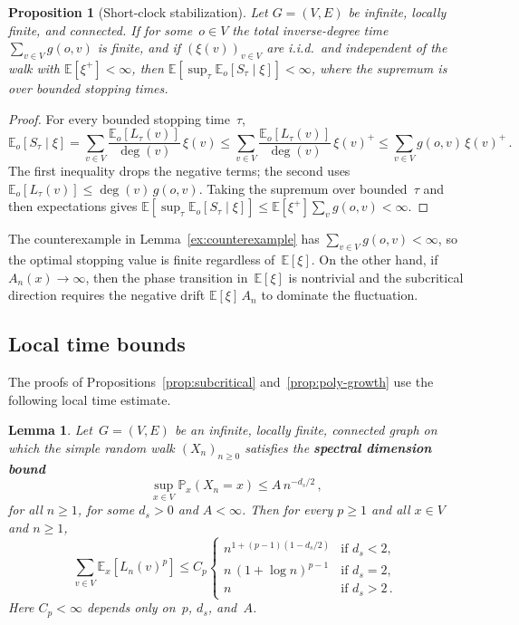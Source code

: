 \documentclass[aop]{imsart}
\theoremstyle{plain}
\newtheorem{proposition}[theorem]{Proposition}
\newtheorem{lemma}[theorem]{Lemma}
\theoremstyle{definition}
\newcommand{\E}{\mathbb{E}}
\renewcommand{\P}{\mathbb{P}}
\begin{document}
	\begin{proposition}[Short-clock stabilization]\label{prop:short-clock}
		Let $G=(V,E)$ be infinite, locally finite, and connected. If for some~$o \in V$ the total inverse-degree time $\sum_{v\in V}g(o,v)$ is finite, and if $(\xi(v))_{v\in V}$ are i.i.d.\ and independent of the walk with $\E[\xi^+]<\infty$, then $\E[\sup_\tau\E_o[S_\tau\mid\xi]] < \infty$, where the supremum is over bounded stopping times.
	\end{proposition}
	\begin{proof}
		For every bounded stopping time~$\tau$,
		\[
		\E_o[S_\tau\mid\xi]
		=\sum_{v\in V}\frac{\E_o[L_\tau(v)]}{\deg(v)}\,\xi(v)
		\leq\sum_{v\in V}\frac{\E_o[L_\tau(v)]}{\deg(v)}\,\xi(v)^+
		\leq\sum_{v\in V}g(o,v)\,\xi(v)^+\,.
		\]
		The first inequality drops the negative terms; the second uses $\E_o[L_\tau(v)]\leq\deg(v)\,g(o,v)$.
		Taking the supremum over bounded~$\tau$ and then expectations gives
		$\E[\sup_\tau\E_o[S_\tau\mid\xi]]\leq\E[\xi^+]\sum_v g(o,v)<\infty$.
	\end{proof}
	
	The counterexample in Lemma~\ref{ex:counterexample} has $\sum_{v\in V} g(o,v)<\infty$, so the optimal stopping value is finite regardless of~$\E[\xi]$. On the other hand, if $A_n(x)\to\infty$, then the phase transition in~$\E[\xi]$ is nontrivial and the subcritical direction requires the negative drift $\E[\xi]\,A_n$ to dominate the fluctuation.
	
	\subsection{Local time bounds}
	
	The proofs of Propositions~\ref{prop:subcritical} and~\ref{prop:poly-growth} use the following local time estimate.
	
	\begin{lemma}\label{lem:local-time}
		Let~$G = (V,E)$ be an infinite, locally finite, connected graph on which the simple random walk $(X_n)_{n\geq 0}$ satisfies the \textbf{spectral dimension bound}
		\begin{equation}\label{eq:return-bound}
			\sup_{x\in V}\P_x(X_n=x)\leq A\,n^{-d_s/2}\,,
		\end{equation}
		for all $n\geq 1$, for some $d_s>0$ and $A<\infty$.
		Then for every $p \geq 1$ and all $x \in V$ and $n \geq 1$,
		\[
		\sum_{v\in V} \E_x[L_n(v)^p] \leq C_p\begin{cases}
			n^{1+(p-1)(1-d_s/2)} & \text{if } d_s<2,\\[3pt]
			n\,(1+\log n)^{p-1} & \text{if } d_s=2,\\[3pt]
			n & \text{if } d_s>2\,.
		\end{cases}\,
		\]
		Here $C_p<\infty$ depends only on~$p$, $d_s$, and~$A$.
	\end{lemma}
	
\end{document}
